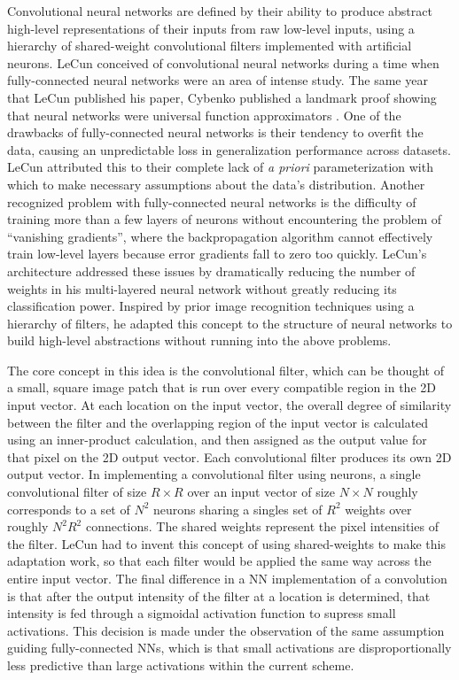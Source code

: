 \documentclass[midd]{thesis}
\begin{document}
Convolutional neural networks are defined by their ability to produce abstract high-level representations of their inputs from raw low-level inputs, using a hierarchy of shared-weight convolutional filters implemented with artificial neurons. LeCun conceived of convolutional neural networks during a time when fully-connected neural networks were an area of intense study. The same year that LeCun published his paper, Cybenko published a landmark proof showing that neural networks were universal function approximators \cite{cybenko1989approximation}. 
One of the drawbacks of fully-connected neural networks is their tendency to overfit the data, causing an unpredictable loss in generalization performance across datasets. LeCun attributed this to their complete lack of \emph{a priori} parameterization with which to make necessary assumptions about the data's distribution. Another recognized problem with fully-connected neural networks is the difficulty of training more than a few layers of neurons without encountering the problem of ``vanishing gradients'', where the backpropagation algorithm cannot effectively train low-level layers because error gradients fall to zero too quickly. 
LeCun's architecture addressed these issues by dramatically reducing the number of weights in his multi-layered neural network without greatly reducing its classification power. Inspired by prior image recognition techniques using a hierarchy of filters, he adapted this concept to the structure of neural networks to build high-level abstractions without running into the above problems. 

The core concept in this idea is the convolutional filter, which can be thought of a small, square image patch that is run over every compatible region in the 2D input vector. At each location on the input vector, the overall degree of similarity between the filter and the overlapping region of the input vector is calculated using an inner-product calculation, and then assigned as the output value for that pixel on the 2D output vector. Each convolutional filter produces its own 2D output vector. In implementing a convolutional filter using neurons, a single convolutional filter of size $R\times R$ over an input vector of size $N\times N$ roughly corresponds to a set of $N^2$ neurons sharing a singles set of $R^2$ weights over roughly $N^2R^2$ connections. The shared weights represent the pixel intensities of the filter. LeCun had to invent this concept of using shared-weights to make this adaptation work, so that each filter would be applied the same way across the entire input vector. The final difference in a NN implementation of a convolution is that after the output intensity of the filter at a location is determined, that intensity is fed through a sigmoidal activation function to supress small activations. This decision is made under the observation of the same assumption guiding fully-connected NNs, which is that small activations are disproportionally less predictive than large activations within the current scheme.
\end{document}
